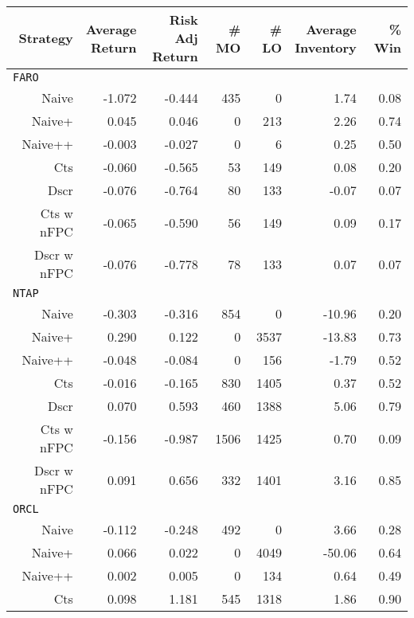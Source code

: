 \begin{table}
\centering
{}
\setlength{\tabcolsep}{9pt}
\begin{tabular}{@{} *{7}{r} @{}}
\toprule
Strategy & \cellbreak{t}{r}{Average \\ Return} & \cellbreak{t}{r}{Risk Adj \\ Return} & \cellbreak{t}{r}{\# MO \\ \hphantom{Risk Adj}} & \cellbreak{t}{r}{\# LO \\ \hphantom{Risk Adj}} & \cellbreak{t}{r}{Average \\ Inventory} & \cellbreak{t}{r}{\% Win \\ \hphantom{Risk Adj}} \\
\midrule
\multicolumn{7}{l}{\texttt{FARO}} \\ 
Naive & -1.072 & -0.444 & 435 & 0 & 1.74 & 0.08 \\
Naive+ & 0.045 & 0.046 & 0 & 213 & 2.26 & 0.74 \\
Naive++ & -0.003 & -0.027 & 0 & 6 & 0.25 & 0.50 \\
Cts & -0.060 & -0.565 & 53 & 149 & 0.08 & 0.20 \\
Dscr & -0.076 & -0.764 & 80 & 133 & -0.07 & 0.07 \\
Cts w nFPC & -0.065 & -0.590 & 56 & 149 & 0.09 & 0.17 \\
Dscr w nFPC & -0.076 & -0.778 & 78 & 133 & 0.07 & 0.07 \\[2ex]
\multicolumn{7}{l}{\texttt{NTAP}} \\ 
Naive & -0.303 & -0.316 & 854 & 0 & -10.96 & 0.20 \\
Naive+ & 0.290 & 0.122 & 0 & 3537 & -13.83 & 0.73 \\
Naive++ & -0.048 & -0.084 & 0 & 156 & -1.79 & 0.52 \\
Cts & -0.016 & -0.165 & 830 & 1405 & 0.37 & 0.52 \\
Dscr & 0.070 & 0.593 & 460 & 1388 & 5.06 & 0.79 \\
Cts w nFPC & -0.156 & -0.987 & 1506 & 1425 & 0.70 & 0.09 \\
Dscr w nFPC & 0.091 & 0.656 & 332 & 1401 & 3.16 & 0.85 \\[2ex]
\multicolumn{7}{l}{\texttt{ORCL}} \\ 
Naive & -0.112 & -0.248 & 492 & 0 & 3.66 & 0.28 \\
Naive+ & 0.066 & 0.022 & 0 & 4049 & -50.06 & 0.64 \\
Naive++ & 0.002 & 0.005 & 0 & 134 & 0.64 & 0.49 \\
Cts & 0.098 & 1.181 & 545 & 1318 & 1.86 & 0.90 \\

\end{tabular}
\end{table}

